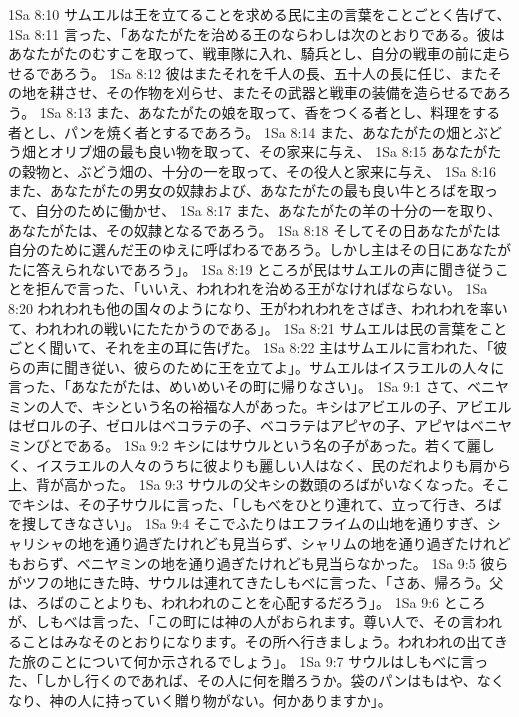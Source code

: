 1Sa 8:10  サムエルは王を立てることを求める民に主の言葉をことごとく告げて、
1Sa 8:11  言った、「あなたがたを治める王のならわしは次のとおりである。彼はあなたがたのむすこを取って、戦車隊に入れ、騎兵とし、自分の戦車の前に走らせるであろう。
1Sa 8:12  彼はまたそれを千人の長、五十人の長に任じ、またその地を耕させ、その作物を刈らせ、またその武器と戦車の装備を造らせるであろう。
1Sa 8:13  また、あなたがたの娘を取って、香をつくる者とし、料理をする者とし、パンを焼く者とするであろう。
1Sa 8:14  また、あなたがたの畑とぶどう畑とオリブ畑の最も良い物を取って、その家来に与え、
1Sa 8:15  あなたがたの穀物と、ぶどう畑の、十分の一を取って、その役人と家来に与え、
1Sa 8:16  また、あなたがたの男女の奴隷および、あなたがたの最も良い牛とろばを取って、自分のために働かせ、
1Sa 8:17  また、あなたがたの羊の十分の一を取り、あなたがたは、その奴隷となるであろう。
1Sa 8:18  そしてその日あなたがたは自分のために選んだ王のゆえに呼ばわるであろう。しかし主はその日にあなたがたに答えられないであろう」。
1Sa 8:19  ところが民はサムエルの声に聞き従うことを拒んで言った、「いいえ、われわれを治める王がなければならない。
1Sa 8:20  われわれも他の国々のようになり、王がわれわれをさばき、われわれを率いて、われわれの戦いにたたかうのである」。
1Sa 8:21  サムエルは民の言葉をことごとく聞いて、それを主の耳に告げた。
1Sa 8:22  主はサムエルに言われた、「彼らの声に聞き従い、彼らのために王を立てよ」。サムエルはイスラエルの人々に言った、「あなたがたは、めいめいその町に帰りなさい」。
1Sa 9:1  さて、ベニヤミンの人で、キシという名の裕福な人があった。キシはアビエルの子、アビエルはゼロルの子、ゼロルはベコラテの子、ベコラテはアピヤの子、アピヤはベニヤミンびとである。
1Sa 9:2  キシにはサウルという名の子があった。若くて麗しく、イスラエルの人々のうちに彼よりも麗しい人はなく、民のだれよりも肩から上、背が高かった。
1Sa 9:3  サウルの父キシの数頭のろばがいなくなった。そこでキシは、その子サウルに言った、「しもべをひとり連れて、立って行き、ろばを捜してきなさい」。
1Sa 9:4  そこでふたりはエフライムの山地を通りすぎ、シャリシャの地を通り過ぎたけれども見当らず、シャリムの地を通り過ぎたけれどもおらず、ベニヤミンの地を通り過ぎたけれども見当らなかった。
1Sa 9:5  彼らがツフの地にきた時、サウルは連れてきたしもべに言った、「さあ、帰ろう。父は、ろばのことよりも、われわれのことを心配するだろう」。
1Sa 9:6  ところが、しもべは言った、「この町には神の人がおられます。尊い人で、その言われることはみなそのとおりになります。その所へ行きましょう。われわれの出てきた旅のことについて何か示されるでしょう」。
1Sa 9:7  サウルはしもべに言った、「しかし行くのであれば、その人に何を贈ろうか。袋のパンはもはや、なくなり、神の人に持っていく贈り物がない。何かありますか」。

